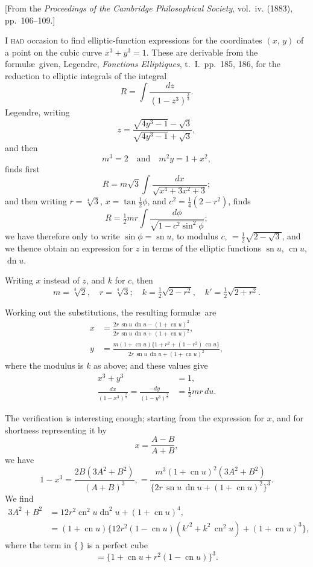 \documentclass[11pt,a4paper]{book}
\begin{document}
\begin{center}
\small[From the \textit{Proceedings of the Cambridge Philosophical Society}, vol.~iv. (1883),\\
pp.~106--109.]
\end{center}

\bigskip

\noindent
\textsc{I had} occasion to find elliptic-function expressions for the coordinates $(x,\,y)$ of a point on the cubic curve $x^3 + y^3 = 1$. These are derivable from the formul\ae\ given, Legendre, \textit{Fonctions Elliptiques}, t.~I.\ pp.~185, 186, for the reduction to elliptic integrals of the integral
\[
R = \int \frac{dz}{(1-z^3)^{\frac{2}{3}}}.
\]
Legendre, writing
\[
z = \frac{\sqrt{4y^3-1} - \sqrt{3}}{\sqrt{4y^3-1} + \sqrt{3}},
\]
and then
\[
m^3 = 2 \quad\text{and}\quad m^2 y = 1 + x^2,
\]
finds first
\[
R = m\sqrt{3}\int \frac{dx}{\sqrt{x^4 + 3x^2 + 3}};
\]
and then writing $r = \sqrt[4]{3}$, $x = \tan\frac{1}{2}\phi$, and $c^2 = \frac{1}{4}(2-r^2)$, finds
\[
R = \tfrac{1}{2}mr \int \frac{d\phi}{\sqrt{1-c^2 \sin^2 \phi}};
\]
we have therefore only to write $\sin\phi = \operatorname{sn} u$, to modulus $c$, $= \frac{1}{2}\sqrt{2-\sqrt{3}}$, and we thence obtain an expression for $z$ in terms of the elliptic functions $\operatorname{sn} u$, $\operatorname{cn} u$, $\operatorname{dn} u$.

Writing $x$ instead of $z$, and $k$ for $c$, then
\[
m = \sqrt[3]{2},\quad r = \sqrt[4]{3};\quad k = \tfrac{1}{2}\sqrt{2-r^2},\quad k' = \tfrac{1}{2}\sqrt{2+r^2}.
\]

Working out the substitutions, the resulting formul\ae\ are
\begin{align*}
x &= \frac{2r\,\operatorname{sn} u\,\operatorname{dn} u - (1+\operatorname{cn} u)^2}{2r\,\operatorname{sn} u\,\operatorname{dn} u + (1+\operatorname{cn} u)^2},\\[0.5em]
y &= \frac{m(1+\operatorname{cn} u)\{1+r^2 + (1-r^2)\,\operatorname{cn} u\}}{2r\,\operatorname{sn} u\,\operatorname{dn} u + (1+\operatorname{cn} u)^2},
\end{align*}
where the modulus is $k$ as above; and these values give
\begin{align*}
x^3 + y^3 &= 1,\\
\frac{dx}{(1-x^3)^{\frac{2}{3}}} = \frac{-dy}{(1-y^3)^{\frac{2}{3}}} &= \tfrac{1}{2}mr\,du.
\end{align*}

The verification is interesting enough; starting from the expression for $x$, and for shortness representing it by
\[
x = \frac{A-B}{A+B},
\]
we have
\[
1-x^3 = \frac{2B(3A^2+B^2)}{(A+B)^3},
= \frac{m^3(1+\operatorname{cn} u)^2 (3A^2+B^2)}{\{2r\,\operatorname{sn} u\,\operatorname{dn} u + (1+\operatorname{cn} u)^2\}^3}.
\]
We find
\begin{align*}
3A^2 + B^2 &= 12r^2 \operatorname{cn}^2 u \operatorname{dn}^2 u + (1+\operatorname{cn} u)^4,\\
&= (1+\operatorname{cn} u)\{12r^2(1-\operatorname{cn} u)(k'^2 + k^2\,\operatorname{cn}^2 u) + (1+\operatorname{cn} u)^3\},
\end{align*}
where the term in $\{\ \}$ is a perfect cube
\[
= \{1 + \operatorname{cn} u + r^2(1-\operatorname{cn} u)\}^3.
\]
\end{document}
